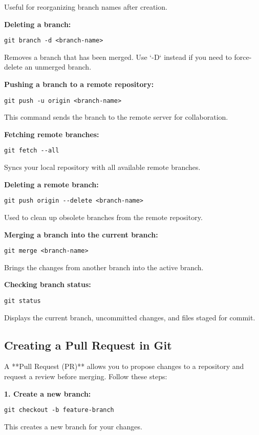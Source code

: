 Useful for reorganizing branch names after creation.

\textbf{Deleting a branch:}
\begin{lstlisting}
git branch -d <branch-name>
\end{lstlisting}

Removes a branch that has been merged. Use `-D` instead if you need to force-delete an unmerged branch.

\textbf{Pushing a branch to a remote repository:}
\begin{lstlisting}
git push -u origin <branch-name>
\end{lstlisting}

This command sends the branch to the remote server for collaboration.

\textbf{Fetching remote branches:}
\begin{lstlisting}
git fetch --all
\end{lstlisting}

Syncs your local repository with all available remote branches.

\textbf{Deleting a remote branch:}
\begin{lstlisting}
git push origin --delete <branch-name>
\end{lstlisting}

Used to clean up obsolete branches from the remote repository.

\textbf{Merging a branch into the current branch:}
\begin{lstlisting}
git merge <branch-name>
\end{lstlisting}

Brings the changes from another branch into the active branch.

\textbf{Checking branch status:}
\begin{lstlisting}
git status
\end{lstlisting}

Displays the current branch, uncommitted changes, and files staged for commit.

\subsection{Creating a Pull Request in Git}

A **Pull Request (PR)** allows you to propose changes to a repository and request a review before merging. Follow these steps:

\textbf{1. Create a new branch:}
\begin{lstlisting}
git checkout -b feature-branch
\end{lstlisting}
This creates a new branch for your changes.

